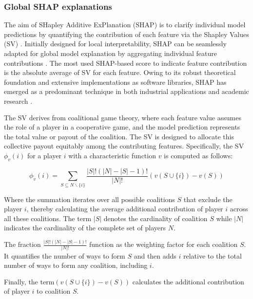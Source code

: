 \subsubsection{Global SHAP explanations}
\label{chap2_shap}

The aim of SHapley Additive ExPlanation (\gls{SHAP}) is to clarify individual model predictions by quantifying the contribution of each feature via the Shapley Values (SV) \cite{Shapley1953AGames}. Initially designed for local interpretability, \gls{SHAP} can be seamlessly adapted for global model explanation by aggregating individual feature contributions \cite{Lundberg2020FromTrees.}. The most used \gls{SHAP}-based score to indicate feature contribution is the absolute average of SV for each feature. Owing to its robust theoretical foundation and extensive implementations as software libraries, \gls{SHAP} has emerged as a predominant technique in both industrial applications and academic research \cite{Bhatt2020ExplainableDeployment}.

The SV derives from coalitional game theory, where each feature value assumes the role of a player in a cooperative game, and the model prediction represents the total value or payout of the coalition. The SV is designed to allocate this collective payout equitably among the contributing features. Specifically, the SV $\phi_v(i)$ for a player $i$ with a characteristic function $v$ is computed as follows: 

\begin{equation}
\phi_v(i) = \sum_{S \subseteq N \backslash \{i\}} \frac{|S|! \left( |N| - |S| - 1 \right)!}{|N|!} \left( v\left( S \cup \{i\} \right) - v(S) \right)
\end{equation}

Where the summation iterates over all possible coalitions $S$ that exclude the player \(i\), thereby calculating the average additional contribution of player $i$ across all these coalitions. The term $|S|$ denotes the cardinality of coalition $S$ while $|N|$ indicates the cardinality of the complete set of players $N$. 

The fraction $\frac{|S|! \left( |N| - |S| - 1 \right)!}{|N|!}$ function as the weighting factor for each coalition $S$. It quantifies the number of ways to form $S$ and then adds $i$ relative to the total number of ways to form any coalition, including $i$. 

Finally,  the term$\left( v\left( S \cup \{i\} \right) - v(S) \right)$ calculates the additional contribution of player $i$ to coalition $S$. 

